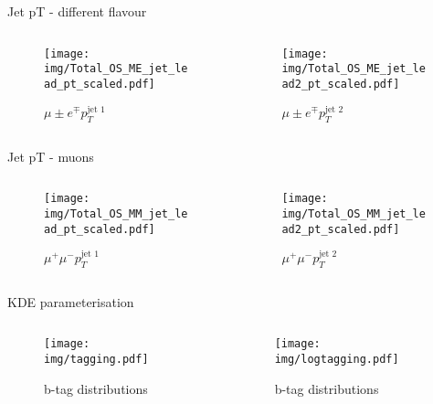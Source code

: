 \documentclass{beamer}
\begin{document}
\begin{frame}{Jet pT - different flavour}
  \begin{columns}
    \begin{column}{0.45\textwidth}\begin{figure}
      \caption{$\mu{\pm}e^{\mp}p_{T}^{\text{jet 1}}$}
      \texttt{[image: img/Total\_OS\_ME\_jet\_lead\_pt\_scaled.pdf]}
    \end{figure}\end{column}
    \begin{column}{0.45\textwidth}\begin{figure}
      \caption{$\mu{\pm}e^{\mp}p_{T}^{\text{jet 2}}$}
      \texttt{[image: img/Total\_OS\_ME\_jet\_lead2\_pt\_scaled.pdf]}
    \end{figure}\end{column}
  \end{columns}
\end{frame}

\begin{frame}{Jet pT - muons}
  \begin{columns}
    \begin{column}{0.45\textwidth}\begin{figure}
      \caption{$\mu^{+}\mu^{-}p_{T}^{\text{jet 1}}$}
      \texttt{[image: img/Total\_OS\_MM\_jet\_lead\_pt\_scaled.pdf]}
    \end{figure}\end{column}
    \begin{column}{0.45\textwidth}\begin{figure}
      \caption{$\mu^{+}\mu^{-}p_{T}^{\text{jet 2}}$}
      \texttt{[image: img/Total\_OS\_MM\_jet\_lead2\_pt\_scaled.pdf]}
    \end{figure}\end{column}
  \end{columns}
\end{frame}

\begin{frame}{KDE parameterisation}
  \begin{columns}
    \begin{column}{0.45\textwidth}\begin{figure}
      \caption{b-tag distributions}
      \texttt{[image: img/tagging.pdf]}
    \end{figure}\end{column}
    \begin{column}{0.45\textwidth}\begin{figure}
      \caption{b-tag distributions}
      \texttt{[image: img/logtagging.pdf]}
    \end{figure}\end{column}
  \end{columns}
\end{frame}
\end{document}
